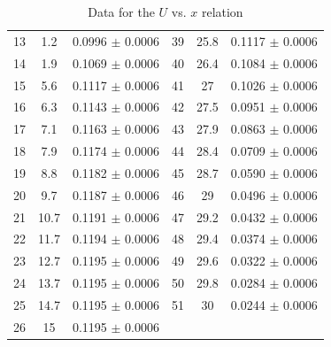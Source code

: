 \documentclass{article}
\begin{document}
\begin{table}[htbp]
\begin{tabular}{ccc||ccc}
    13    & 1.2  & 0.0996 $\pm$ 0.0006 & 39    & 25.8  & 0.1117 $\pm$ 0.0006 \\
    14    & 1.9  & 0.1069 $\pm$ 0.0006 & 40    & 26.4  & 0.1084 $\pm$ 0.0006 \\
    15    & 5.6  & 0.1117 $\pm$ 0.0006 & 41    & 27    & 0.1026 $\pm$ 0.0006 \\
    16    & 6.3  & 0.1143 $\pm$ 0.0006 & 42    & 27.5  & 0.0951 $\pm$ 0.0006 \\
    17    & 7.1  & 0.1163 $\pm$ 0.0006 & 43    & 27.9  & 0.0863 $\pm$ 0.0006 \\
    18    & 7.9  & 0.1174 $\pm$ 0.0006 & 44    & 28.4  & 0.0709 $\pm$ 0.0006 \\
    19    & 8.8  & 0.1182 $\pm$ 0.0006 & 45    & 28.7  & 0.0590 $\pm$ 0.0006 \\
    20    & 9.7  & 0.1187 $\pm$ 0.0006 & 46    & 29    & 0.0496 $\pm$ 0.0006 \\
    21    & 10.7 & 0.1191 $\pm$ 0.0006 & 47    & 29.2  & 0.0432 $\pm$ 0.0006 \\
    22    & 11.7 & 0.1194 $\pm$ 0.0006 & 48    & 29.4  & 0.0374 $\pm$ 0.0006 \\
    23    & 12.7 & 0.1195 $\pm$ 0.0006 & 49    & 29.6  & 0.0322 $\pm$ 0.0006 \\
    24    & 13.7 & 0.1195 $\pm$ 0.0006 & 50    & 29.8  & 0.0284 $\pm$ 0.0006 \\
    25    & 14.7 & 0.1195 $\pm$ 0.0006 & 51    & 30    & 0.0244 $\pm$ 0.0006 \\
    26    & 15   & 0.1195 $\pm$ 0.0006   \\
\bottomrule
\end{tabular}
\caption{Data for the $U$ vs. $x$ relation}\label{TableUx}
\end{table}
\end{document}
